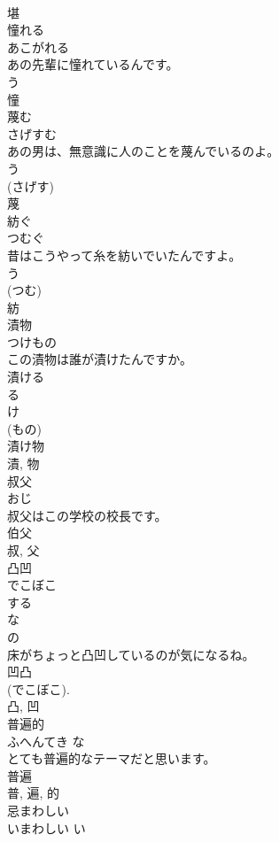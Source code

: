 \documentclass[8pt]{extreport}
\begin{document}
\begin{CJK}{UTF8}{min}
\\	堪	
\\	憧れる	
\\	あこがれる	
\\	あの先輩に憧れているんです。	
\\	う 
\\	憧	
\\	蔑む	
\\	さげすむ	
\\	あの男は、無意識に人のことを蔑んでいるのよ。	
\\	う 
\\	(さげす) 
\\	蔑	
\\	紡ぐ	
\\	つむぐ	
\\	昔はこうやって糸を紡いでいたんですよ。	
\\	う 
\\	(つむ) 
\\	紡	
\\	漬物	
\\	つけもの	
\\	この漬物は誰が漬けたんですか。	
\\	漬ける 
\\	る 
\\	け 
\\	(もの) 
\\	漬け物 
\\	漬, 物	
\\	叔父	
\\	おじ	
\\	叔父はこの学校の校長です。	
\\	伯父 
\\	叔, 父	
\\	凸凹	
\\	でこぼこ	
\\	する 
\\	な 
\\	の 
\\	床がちょっと凸凹しているのが気になるね。	
\\	凹凸 
\\	(でこぼこ). 
\\	凸, 凹	
\\	普遍的	
\\	ふへんてき	な 
\\	とても普遍的なテーマだと思います。	
\\	普遍 
\\	普, 遍, 的	
\\	忌まわしい	
\\	いまわしい	い 

\end{CJK}
\end{document}

